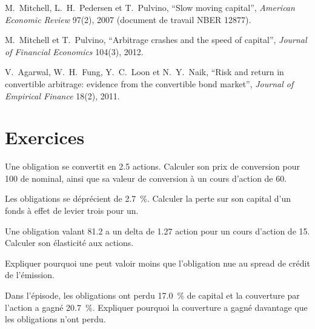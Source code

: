 \begin{omsources}
\item M.~Mitchell, L.~H.~Pedersen et T.~Pulvino, ``Slow moving capital'', \emph{American Economic Review} 97(2), 2007 (document de travail NBER 12877).
\item M.~Mitchell et T.~Pulvino, ``Arbitrage crashes and the speed of capital'', \emph{Journal of Financial Economics} 104(3), 2012.
\item V.~Agarwal, W.~H.~Fung, Y.~C.~Loon et N.~Y.~Naik, ``Risk and return in convertible arbitrage: evidence from the convertible bond market'',
\emph{Journal of Empirical Finance} 18(2), 2011.
\end{omsources}

\section{Exercices}

\begin{exercise}[$\star$]\label{exo:s2:convertible-arbitrage:1}
Une obligation se convertit en 2.5 actions. Calculer son prix de conversion pour 100 de nominal, ainsi que sa valeur de conversion à un cours d'action de 60.
\end{exercise}

\begin{exercise}[$\star$]\label{exo:s2:convertible-arbitrage:2}
Les obligations se déprécient de 2.7~\%. Calculer la perte sur son capital d'un fonds à effet de levier trois pour un.
\end{exercise}

\begin{exercise}[$\star$]\label{exo:s2:convertible-arbitrage:3}
Une obligation valant 81.2 a un delta de 1.27 action pour un cours d'action de 15. Calculer son élasticité aux actions.
\end{exercise}

\begin{exercise}[$\star\star$]\label{exo:s2:convertible-arbitrage:4}
Expliquer pourquoi une  peut valoir moins que l'obligation nue au spread de crédit de l'émission.
\end{exercise}

\begin{exercise}[$\star\star$]\label{exo:s2:convertible-arbitrage:5}
Dans l'épisode, les obligations ont perdu 17.0~\% de capital et la couverture par l'action a gagné 20.7~\%. Expliquer pourquoi la couverture a gagné davantage que les obligations n'ont perdu.
\end{exercise}

